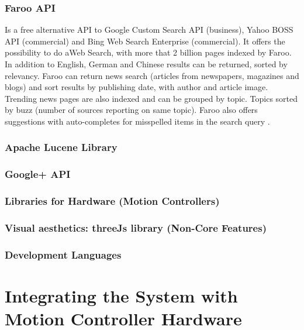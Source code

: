 \documentclass[10pt]{article}
\begin{document}
\subsubsection{Faroo API}
Is a free alternative API to Google Custom Search API (business), Yahoo BOSS API  (commercial) and Bing Web Search Enterprise (commercial). It offers the possibility to do aWeb Search, with more that 2 billion pages indexed by Faroo. In addition to English, German and Chinese results can be returned, sorted by relevancy.  Faroo can return news search (articles from newspapers, magazines and blogs) and sort results by publishing date, with author and article image. Trending news pages are also indexed and can be grouped by topic. Topics sorted by buzz (number of sources reporting on same topic). Faroo also offers suggestions with auto-completes for misspelled items in the search query \cite{faroo}.

\subsubsection{Apache Lucene Library}

\subsubsection{Google+ API}
\subsubsection{Libraries for Hardware (Motion Controllers)}
\subsubsection{Visual aesthetics: threeJs library (Non-Core Features)}
\subsubsection{Development Languages}

\section{Integrating the System with Motion Controller Hardware }
\end{document}
